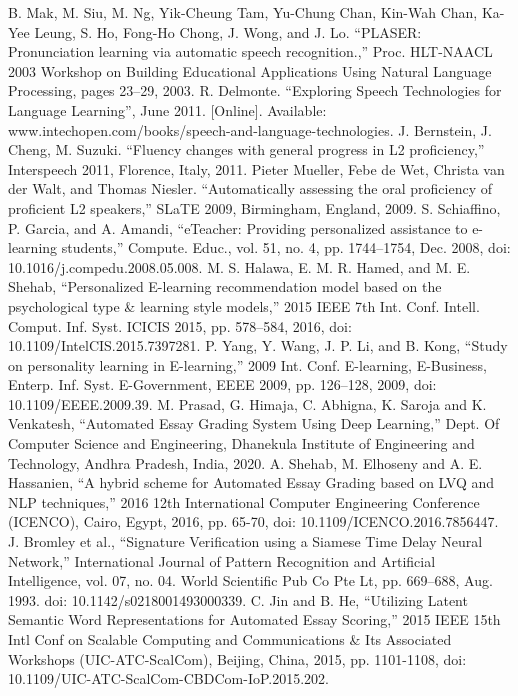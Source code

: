 \documentclass[conference]{IEEEtran}
\begin{document}
\begin{thebibliography}{00}
 B. Mak, M. Siu, M. Ng, Yik-Cheung Tam, Yu-Chung Chan, Kin-Wah Chan, Ka-Yee Leung, S. Ho, Fong-Ho Chong, J. Wong, and J. Lo. ``PLASER: Pronunciation learning via automatic speech recognition.,'' Proc. HLT-NAACL 2003 Workshop on Building Educational Applications Using Natural Language Processing, pages 23–29, 2003.
 R. Delmonte. ``Exploring Speech Technologies for Language Learning'', June 2011. [Online]. Available: www.intechopen.com/books/speech-and-language-technologies.
 J. Bernstein, J. Cheng, M. Suzuki. ``Fluency changes with general progress in L2 proficiency,'' Interspeech 2011, Florence, Italy, 2011.
 Pieter Mueller, Febe de Wet, Christa van der Walt, and Thomas Niesler. ``Automatically assessing the oral proficiency of proficient L2 speakers,'' SLaTE 2009, Birmingham, England, 2009.
 S. Schiaffino, P. Garcia, and A. Amandi, ``eTeacher: Providing personalized assistance to e-learning students,'' Compute. Educ., vol. 51, no. 4, pp. 1744–1754, Dec. 2008, doi: 10.1016/j.compedu.2008.05.008.
 M. S. Halawa, E. M. R. Hamed, and M. E. Shehab, ``Personalized E-learning recommendation model based on the psychological type \& learning style models,'' 2015 IEEE 7th Int. Conf. Intell. Comput. Inf. Syst. ICICIS 2015, pp. 578–584, 2016, doi: 10.1109/IntelCIS.2015.7397281.
 P. Yang, Y. Wang, J. P. Li, and B. Kong, ``Study on personality learning in E-learning,'' 2009 Int. Conf. E-learning, E-Business, Enterp. Inf. Syst. E-Government, EEEE 2009, pp. 126–128, 2009, doi: 10.1109/EEEE.2009.39.
 M. Prasad, G. Himaja, C. Abhigna, K. Saroja and K. Venkatesh, ``Automated Essay Grading System Using Deep Learning,'' Dept. Of Computer Science and Engineering, Dhanekula Institute of Engineering and Technology, Andhra Pradesh, India, 2020.
 A. Shehab, M. Elhoseny and A. E. Hassanien, ``A hybrid scheme for Automated Essay Grading based on LVQ and NLP techniques,'' 2016 12th International Computer Engineering Conference (ICENCO), Cairo, Egypt, 2016, pp. 65-70, doi: 10.1109/ICENCO.2016.7856447.
 J. Bromley et al., ``Signature Verification using a Siamese Time Delay Neural Network,'' International Journal of Pattern Recognition and Artificial Intelligence, vol. 07, no. 04. World Scientific Pub Co Pte Lt, pp. 669–688, Aug. 1993. doi: 10.1142/s0218001493000339.
 C. Jin and B. He, ``Utilizing Latent Semantic Word Representations for Automated Essay Scoring,'' 2015 IEEE 15th Intl Conf on Scalable Computing and Communications \& Its Associated Workshops (UIC-ATC-ScalCom), Beijing, China, 2015, pp. 1101-1108, doi: 10.1109/UIC-ATC-ScalCom-CBDCom-IoP.2015.202.

\end{thebibliography}
\end{document}
